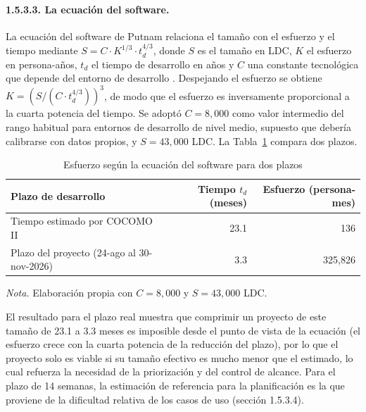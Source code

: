 \paragraph{1.5.3.3. La ecuación del software.}

La ecuación del software de Putnam relaciona el tamaño con el esfuerzo y el tiempo mediante $S = C \cdot K^{1/3} \cdot t_d^{4/3}$, donde $S$ es el tamaño en LDC, $K$ el esfuerzo en persona-años, $t_d$ el tiempo de desarrollo en años y $C$ una constante tecnológica que depende del entorno de desarrollo \parencite{putnam1992measures}. Despejando el esfuerzo se obtiene $K = (S / (C \cdot t_d^{4/3}))^{3}$, de modo que el esfuerzo es inversamente proporcional a la cuarta potencia del tiempo. Se adoptó $C = 8{,}000$ como valor intermedio del rango habitual para entornos de desarrollo de nivel medio, supuesto que debería calibrarse con datos propios, y $S = 43{,}000$ LDC. La Tabla~\ref{tab:putnam} compara dos plazos.

\begin{table}[H]
\caption{Esfuerzo según la ecuación del software para dos plazos}
\label{tab:putnam}
\begin{threeparttable}
\begin{tabular}{>{\raggedright\arraybackslash}p{6.2cm} r r}
\toprule
Plazo de desarrollo & Tiempo $t_d$ (meses) & Esfuerzo (persona-mes) \\
\midrule
Tiempo estimado por COCOMO II & 23.1 & 136 \\
Plazo del proyecto (24-ago al 30-nov-2026) & 3.3 & 325,826 \\
\bottomrule
\end{tabular}
\begin{tablenotes}
\item \textit{Nota.} Elaboración propia con $C = 8{,}000$ y $S = 43{,}000$ LDC.
\end{tablenotes}
\end{threeparttable}
\end{table}

El resultado para el plazo real muestra que comprimir un proyecto de este tamaño de 23.1 a 3.3 meses es imposible desde el punto de vista de la ecuación (el esfuerzo crece con la cuarta potencia de la reducción del plazo), por lo que el proyecto solo es viable si su tamaño efectivo es mucho menor que el estimado, lo cual refuerza la necesidad de la priorización y del control de alcance. Para el plazo de 14 semanas, la estimación de referencia para la planificación es la que proviene de la dificultad relativa de los casos de uso (sección 1.5.3.4).

